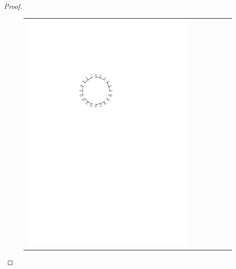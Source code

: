 \documentclass{patmorin}
\begin{document}
\begin{proof}
\begin{figure}
{\begin{tabular}{ccccccc}
       \includegraphics{figs/linear-lower-5} &

\end{tabular}}
\end{figure}
\end{proof}
\end{document}
